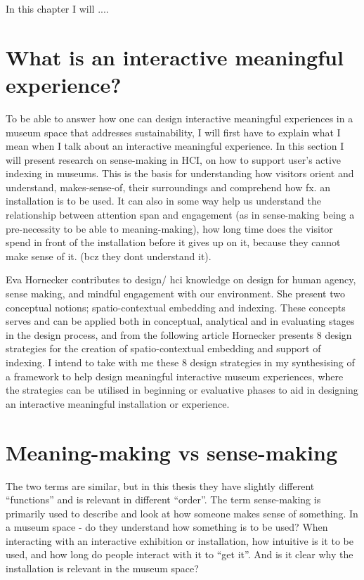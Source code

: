 In this chapter I will ....

\section{What is an interactive meaningful experience?}

To be able to answer how one can design interactive meaningful experiences in a museum space that addresses sustainability, I will first have to explain what I mean when I talk about an interactive meaningful experience. In this section I will present research on sense-making in HCI, on how to support user’s active indexing in museums. This is the basis for understanding how visitors orient and understand, makes-sense-of, their surroundings and comprehend how fx. an installation is to be used. It can also in some way help us understand the relationship between attention span and engagement (as in sense-making being a pre-necessity to be able to meaning-making), how long time does the visitor spend in front of the installation before it gives up on it, because they cannot make sense of it. (bcz they dont understand it).

Eva Hornecker contributes to design/ hci knowledge on design for human agency, sense making, and mindful engagement with our environment. She present two conceptual notions; spatio-contextual embedding and indexing. These concepts serves and can be applied both in conceptual, analytical and in evaluating stages in the design process, and from the following article Hornecker presents 8 design strategies for the creation of spatio-contextual embedding and support of indexing. I intend to take with me these 8 design strategies in my synthesising of a framework to help design meaningful interactive museum experiences, where the strategies can be utilised in beginning or evaluative phases to aid in designing an interactive meaningful installation or experience.


\section{Meaning-making vs sense-making}
The two terms are similar, but in this thesis they have slightly different “functions” and is relevant in different “order”. The term sense-making is primarily used to describe and look at how someone makes sense of something. In a museum space - do they understand how something is to be used? When interacting with an interactive exhibition or installation, how intuitive is it to be used, and how long do people interact with it to “get it”. And is it clear why the installation is relevant in the museum space?

